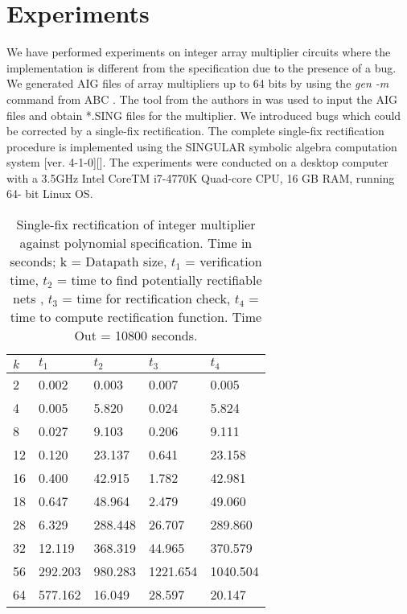 \section{Experiments}
\label{sec:exp}

We have performed experiments on integer array multiplier circuits where the implementation is
different from the specification due to the presence of a bug.
We generated AIG files of array multipliers up to 64 bits by using the \textit{gen -m} command from ABC \cite{ABC}. The tool from the authors in \cite{Armin2017ColumnWiseVO} was used to input the AIG files and obtain *.SING files for the multiplier. We introduced bugs which could be corrected by a single-fix rectification. The complete single-fix rectification procedure is implemented using the SINGULAR symbolic
algebra computation system [ver. 4-1-0][\cite{DGPS_410}]. The experiments
were conducted on a desktop computer with a 3.5GHz Intel
CoreTM i7-4770K Quad-core CPU, 16 GB RAM, running 64-
bit Linux OS. 
\vspace{0.1mm}
\begin{table}[H]
    \centering
    \begin{tabular}{| l | l | l | l | l |}
    \hline
    $k$ & $t_1$ & $t_2$ & $t_3$ & $t_4$ \\ \hline
    2 & 0.002 & 0.003 & 0.007 & 0.005 \\ \hline
    4 & 0.005 & 5.820 & 0.024 & 5.824 \\ \hline
    8 & 0.027 & 9.103 & 0.206 & 9.111 \\ \hline
    12 & 0.120 & 23.137 & 0.641 & 23.158 \\ \hline
    16 & 0.400 & 42.915 & 1.782 & 42.981 \\ \hline
    18 & 0.647 & 48.964 & 2.479 & 49.060  \\ \hline
    28 & 6.329 & 288.448 & 26.707  & 289.860\\ \hline
    32 & 12.119 & 368.319 & 44.965 & 370.579 \\ \hline
    56 & 292.203 & 980.283 & 1221.654 & 1040.504 \\ \hline
    64 & 577.162 & 16.049 & 28.597 & 20.147 \\
    \hline
    \end{tabular}
    \caption{Single-fix rectification of integer multiplier against polynomial specification. Time in seconds; k = Datapath size, $t_1$ = verification time, $t_2$ = time to find potentially rectifiable nets , $t_3$ = time for rectification check, $t_4$ = time to compute rectification function. Time Out = 10800 seconds.}
    \label{tb:tb1}
\end{table}

